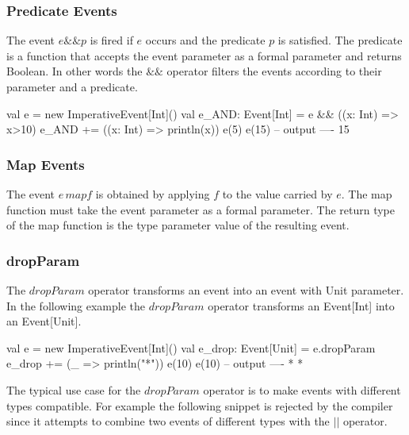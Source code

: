 \documentclass[10pt,a4paper]{article}
\newcommand{\code}[1]{{\fontfamily{cmtt}\small\selectfont#1}}
\begin{document}
\subsubsection{Predicate Events}

The event $e \&\& p$ is fired if $e$ occurs and the predicate $p$ is
satisfied. The predicate is a function that accepts the event
parameter as a formal parameter and returns \code{Boolean}. In other
words the $\&\&$ operator filters the events according to their
parameter and a predicate.

\begin{codenv}
val e = new ImperativeEvent[Int]()
val e_AND: Event[Int] = e && ((x: Int) => x>10)
e_AND += ((x: Int) => println(x))
e(5)
e(15)
-- output ----
15
\end{codenv}


\subsubsection{Map Events}

The event $e\,map f$ is obtained by applying $f$ to the value carried
by $e$. The map function must take the event parameter as a formal
parameter. The return type of the map function is the type parameter
value of the resulting event.





\subsubsection{dropParam}

The $dropParam$ operator transforms an event into an event with
\code{Unit} parameter. In the following example the $dropParam$
operator transforms an \code{Event[Int]} into an \code{Event[Unit]}.

\begin{codenv}
val e = new ImperativeEvent[Int]()
val e_drop: Event[Unit] = e.dropParam  
e_drop += (_ => println("*"))
e(10)
e(10)
-- output ----
*
*
\end{codenv}

The typical use case for the $dropParam$ operator is to make events
with different types compatible. For example the following snippet is
rejected by the compiler since it attempts to combine two events of
different types with the $||$ operator.
\end{document}

